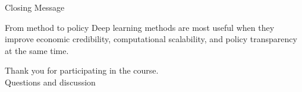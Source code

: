 \documentclass[aspectratio=169,11pt]{beamer}
\newcommand{\emphc}[1]{\textcolor{harvardcrimson}{#1}}
\begin{document}
\begin{frame}{Closing Message}
\begin{block}{From method to policy}
Deep learning methods are most useful when they improve \emphc{economic credibility},
\emphc{computational scalability}, and \emphc{policy transparency} at the same time.
\end{block}

\vspace{0.5cm}
\begin{center}
{\Large Thank you for participating in the course.}\\[6pt]
{\LARGE \emphc{Questions and discussion}}
\end{center}
\end{frame}
\end{document}
